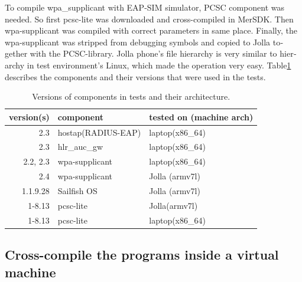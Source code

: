 \documentclass[12pt,a4paper,english]{tutthesis}
\begin{document}
\begin{otherlanguage}{english}
To compile wpa\_supplicant with EAP-SIM simulator, PCSC component was
needed. So first pcsc-lite was downloaded and cross-compiled in
MerSDK. Then wpa-supplicant was compiled with correct parameters in
same place. Finally, the wpa-supplicant was stripped from debugging
symbols and copied to Jolla together with the PCSC-library.  Jolla
phone's file hierarchy is very similar to hierarchy in test
environment's Linux, which made the operation very easy.
Table\ref{version-table} describes the components and their versions that were used in the tests.

\begin{table}[htb]
\caption{\label{version-table}Versions of components in tests and their architecture.}
\centering
\begin{tabular}{rll}
version(s) & component & tested on (machine arch)\\
\hline
2.3 & hostap(RADIUS-EAP) & laptop(x86\_64)\\
2.3 & hlr\_auc\_gw & laptop(x86\_64)\\
2.2, 2.3 & wpa-supplicant & laptop(x86\_64)\\
2.4 & wpa-supplicant & Jolla (armv7l)\\
1.1.9.28 & Sailfish OS & Jolla (armv7l)\\
1-8.13 & pcsc-lite & Jolla(armv7l)\\
1-8.13 & pcsc-lite & laptop(x86\_64)\\
\hline
\end{tabular}
\end{table}

\subsection{Cross-compile the programs inside a virtual machine}
\label{sec-5-3-1}


\end{otherlanguage}
\end{document}
